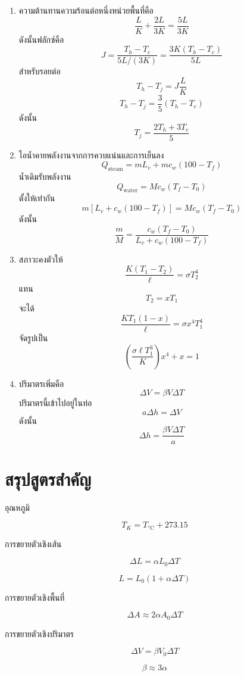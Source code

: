 \begin{enumerate}
    \item ความต้านทานความร้อนต่อหนึ่งหน่วยพื้นที่คือ
    \[
    \frac{L}{K}
    +
    \frac{2L}{3K}
    =
    \frac{5L}{3K}
    \]
    ดังนั้นฟลักซ์คือ
    \[
    \boxed{
    J=
    \frac{T_h-T_c}{5L/(3K)}
    =
    \frac{3K(T_h-T_c)}{5L}
    }
    \]
    สำหรับรอยต่อ
    \[
    T_h-T_j
    =
    J\frac{L}{K}
    \]
    \[
    T_h-T_j
    =
    \frac{3}{5}(T_h-T_c)
    \]
    ดังนั้น
    \[
    \boxed{
    T_j=
    \frac{2T_h+3T_c}{5}
    }
    \]

    \item ไอน้ำคายพลังงานจากการควบแน่นและการเย็นลง
    \[
    Q_{\text{steam}}
    =
    mL_v
    +
    mc_w(100-T_f)
    \]
    น้ำเดิมรับพลังงาน
    \[
    Q_{\text{water}}
    =
    Mc_w(T_f-T_0)
    \]
    ตั้งให้เท่ากัน
    \[
    m\left[L_v+c_w(100-T_f)\right]
    =
    Mc_w(T_f-T_0)
    \]
    ดังนั้น
    \[
    \boxed{
    \frac{m}{M}
    =
    \frac{c_w(T_f-T_0)}
    {L_v+c_w(100-T_f)}
    }
    \]

    \item สภาวะคงตัวให้
    \[
    \frac{K(T_1-T_2)}{\ell}
    =
    \sigma T_2^4
    \]
    แทน
    \[
    T_2=xT_1
    \]
    จะได้
    \[
    \frac{KT_1(1-x)}{\ell}
    =
    \sigma x^4T_1^4
    \]
    จัดรูปเป็น
    \[
    \boxed{
    \left(\frac{\sigma\ell T_1^3}{K}\right)x^4+x=1
    }
    \]

    \item ปริมาตรเพิ่มคือ
    \[
    \Delta V=\beta V\Delta T
    \]
    ปริมาตรนี้เข้าไปอยู่ในท่อ
    \[
    a\Delta h=\Delta V
    \]
    ดังนั้น
    \[
    \boxed{
    \Delta h=\frac{\beta V\Delta T}{a}
    }
    \]
\end{enumerate}

\section{สรุปสูตรสำคัญ}

\begin{tcolorbox}[title=สรุปบท: อุณหภูมิ ความร้อน และการขยายตัวเชิงความร้อน]
อุณหภูมิ

\[
T_{\si{K}}=T_{\si{\degreeCelsius}}+273.15
\]

การขยายตัวเชิงเส้น

\[
\Delta L=\alpha L_0\Delta T
\]

\[
L=L_0(1+\alpha\Delta T)
\]

การขยายตัวเชิงพื้นที่

\[
\Delta A\approx 2\alpha A_0\Delta T
\]

การขยายตัวเชิงปริมาตร

\[
\Delta V=\beta V_0\Delta T
\]

\[
\beta\approx 3\alpha
\]
\end{tcolorbox}

